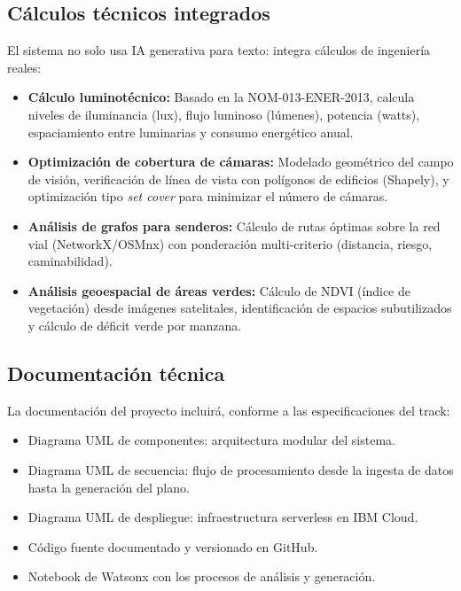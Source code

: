\documentclass[12pt,a4paper]{article}
\begin{document}
\subsection{Cálculos técnicos integrados}

El sistema no solo usa IA generativa para texto: integra cálculos de ingeniería reales:

\begin{itemize}[leftmargin=1.5cm]
    \item \textbf{Cálculo luminotécnico:} Basado en la NOM-013-ENER-2013, calcula niveles de iluminancia (lux), flujo luminoso (lúmenes), potencia (watts), espaciamiento entre luminarias y consumo energético anual.
    
    \item \textbf{Optimización de cobertura de cámaras:} Modelado geométrico del campo de visión, verificación de línea de vista con polígonos de edificios (Shapely), y optimización tipo \textit{set cover} para minimizar el número de cámaras.
    
    \item \textbf{Análisis de grafos para senderos:} Cálculo de rutas óptimas sobre la red vial (NetworkX/OSMnx) con ponderación multi-criterio (distancia, riesgo, caminabilidad).
    
    \item \textbf{Análisis geoespacial de áreas verdes:} Cálculo de NDVI (índice de vegetación) desde imágenes satelitales, identificación de espacios subutilizados y cálculo de déficit verde por manzana.
\end{itemize}

\subsection{Documentación técnica}

La documentación del proyecto incluirá, conforme a las especificaciones del track:

\begin{itemize}[leftmargin=1.5cm]
    \item Diagrama UML de componentes: arquitectura modular del sistema.
    \item Diagrama UML de secuencia: flujo de procesamiento desde la ingesta de datos hasta la generación del plano.
    \item Diagrama UML de despliegue: infraestructura serverless en IBM Cloud.
    \item Código fuente documentado y versionado en GitHub.
    \item Notebook de Watsonx con los procesos de análisis y generación.
\end{itemize}
\end{document}
